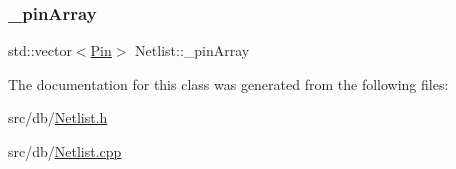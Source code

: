 \mbox{\label{classNetlist_a918185a2ba92067c416408dfc9d8fab2}} 
\subsubsection{\texorpdfstring{\+\_\+pin\+Array}{\_pinArray}}
{\footnotesize\ttfamily std\+::vector$<$\hyperlink{classPin}{Pin}$>$ Netlist\+::\+\_\+pin\+Array\hspace{0.3cm}{\ttfamily [private]}}



The documentation for this class was generated from the following files\+:\begin{DoxyCompactItemize}
\item 
src/db/\hyperlink{Netlist_8h}{Netlist.\+h}\item 
src/db/\hyperlink{Netlist_8cpp}{Netlist.\+cpp}\end{DoxyCompactItemize}
